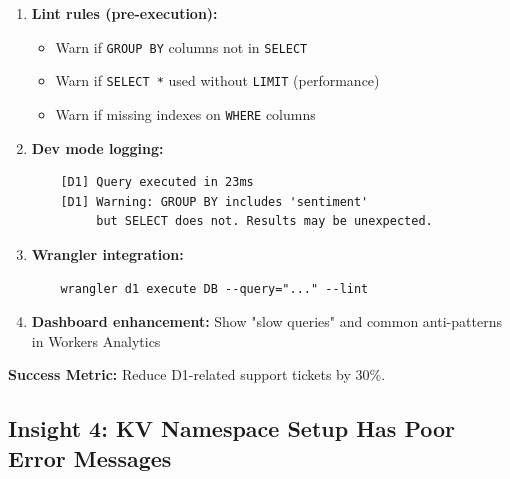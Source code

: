 \documentclass[11pt,a4paper]{article}
\begin{document}
\begin{enumerate}[leftmargin=*, itemsep=0.5em]
    \item \textbf{Lint rules (pre-execution):}
    \begin{itemize}
        \item Warn if \texttt{GROUP BY} columns not in \texttt{SELECT}
        \item Warn if \texttt{SELECT *} used without \texttt{LIMIT} (performance)
        \item Warn if missing indexes on \texttt{WHERE} columns
    \end{itemize}
    
    \item \textbf{Dev mode logging:}
    \begin{verbatim}
    [D1] Query executed in 23ms
    [D1] Warning: GROUP BY includes 'sentiment' 
         but SELECT does not. Results may be unexpected.
    \end{verbatim}
    
    \item \textbf{Wrangler integration:}
    \begin{verbatim}
    wrangler d1 execute DB --query="..." --lint
    \end{verbatim}
    
    \item \textbf{Dashboard enhancement:} Show "slow queries" and common anti-patterns in Workers Analytics
\end{enumerate}

\textbf{Success Metric:} Reduce D1-related support tickets by 30\%.

\newpage

\subsection{Insight 4: KV Namespace Setup Has Poor Error Messages}
\end{document}
